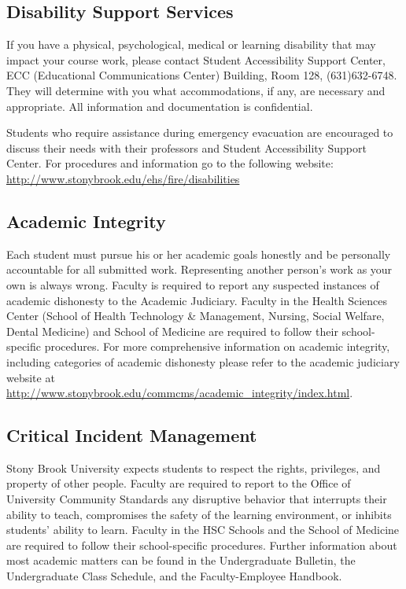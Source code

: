\subsection{Disability Support Services}

If you have a physical, psychological, medical or learning disability that may impact your course work, please contact Student Accessibility Support Center, ECC (Educational Communications Center) Building, Room 128, (631)632-6748.
They will determine with you what accommodations, if any, are necessary and appropriate.
All information and documentation is confidential.

Students who require assistance during emergency evacuation are encouraged to discuss their needs with their professors and Student Accessibility Support Center.
For procedures and information go to the following website:
\url{http://www.stonybrook.edu/ehs/fire/disabilities}

\subsection{Academic Integrity}

Each student must pursue his or her academic goals honestly and be personally accountable for all submitted work.
Representing another person's work as your own is always wrong. Faculty is required to report any suspected instances of academic dishonesty to the Academic Judiciary.
Faculty in the Health Sciences Center (School of Health Technology \& Management, Nursing, Social Welfare, Dental Medicine) and School of Medicine are required to follow their school-specific procedures.
For more comprehensive information on academic integrity, including categories of academic dishonesty please refer to the academic judiciary website at
\url{http://www.stonybrook.edu/commcms/academic_integrity/index.html}.

\subsection{Critical Incident Management}

Stony Brook University expects students to respect the rights, privileges, and property of other people.
Faculty are required to report to the Office of University Community Standards any disruptive behavior that interrupts their ability to teach, compromises the safety of the learning environment, or inhibits students' ability to learn.
Faculty in the HSC Schools and the School of Medicine are required to follow their school-specific procedures.
Further information about most academic matters can be found in the Undergraduate Bulletin, the Undergraduate Class Schedule, and the Faculty-Employee Handbook. 
